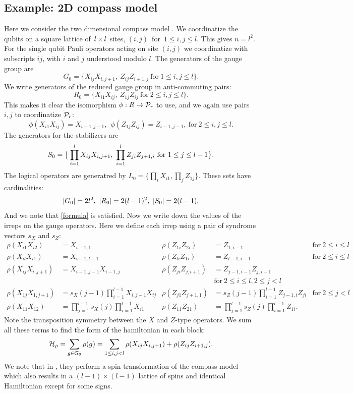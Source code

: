 \documentclass[12pt,notitlepage,longbibliography,nofootinbib,tightenlines]{revtex4}
\begin{document}
\subsection{Example: 2D compass model}

Here we consider the two dimensional compass model \cite{Bacon2006}.
We coordinatize the qubits on a square 
lattice of\ $l\times l$\ sites,
$(i, j)$\ for\ $1\le i, j\le l.$
This gives $n = l^2.$
For the single qubit Pauli operators acting on site
$(i, j)$ we coordinatize with subscripts $ij$, 
with $i$ and $j$ understood modulo $l$.
The generators of the gauge group are
$$
    G_0 = \big\{ X_{ij}X_{i,j+1},\ Z_{ij}Z_{i+1,j}\ \mbox{for}\ 1\le i, j\le l\big\}.
$$
We write generators of the reduced
gauge group in anti-commuting pairs:
$$
    R_0 = \big\{ X_{i1}X_{ij},\ Z_{1j}Z_{ij}\ \mbox{for}\ 2\le i, j\le l\big\}.
$$
This makes it clear the isomorphism $\phi : R \to \mathcal{P}_r$ to use,
and we again use pairs $i,j$ to coordinatize $\mathcal{P}_r$:
$$
    \phi(X_{i1}X_{ij}) = X_{i-1,j-1}, \ \ \phi(Z_{1j}Z_{ij}) = Z_{i-1,j-1},\ \mbox{for}\ 2\le i, j\le l.
$$
The generators for the stabilizers are
$$
    \Stab_0 = \big\{ \prod_{i=1}^l X_{ij}X_{i,j+1},\ \prod_{i=1}^l Z_{ji}Z_{j+1,i}\ \mbox{for}\ 1\le j\le l-1\big\}.
$$
The logical operators are generatred by $L_0 = \big\{ \prod_i X_{i1}, \prod_j Z_{1j} \}.$
These sets have cardinalities:
$$|G_0|=2l^2,\ |R_0| = 2(l-1)^2,\ |\Stab_0| = 2(l-1).$$
And we note that \ref{formula} is satisfied.
Now we write down the values of the
irreps on the gauge operators.
Here we define each irrep using a pair 
of syndrome vectors $s_X$ and $s_Z:$
\begin{align*}
\rho(X_{i1} X_{i2}) &= X_{i-1,1} &
\rho(Z_{1i} Z_{2i}) &= Z_{1,i-1} &\mbox{for}\ 2\le i\le l\\
\rho(X_{il} X_{i1}) &= X_{i-1,l-1} &
\rho(Z_{li} Z_{1i}) &= Z_{l-1,i-1} &\mbox{for}\ 2\le i\le l\\
\rho(X_{ij} X_{i,j+1}) &= X_{i-1,j-1} X_{i-1,j} &
\rho(Z_{ji} Z_{j,i+1}) &= Z_{j-1,i-1}Z_{j,i-1} \\&&&\mbox{for}\ 2\le i\le l, 2\le j<l\\
\rho(X_{1j} X_{1,j+1}) &= s_X(j-1) \prod_{i=1}^{l-1} X_{i,j-1} X_{ij} &
\rho(Z_{j1} Z_{j+1,1}) &= s_Z(j-1) \prod_{i=1}^{l-1} Z_{j-1,i} Z_{ji} &\mbox{for}\ 2\le j<l\\
\rho(X_{11} X_{12}) &= \prod_{j=1}^{l-1}s_X(j) \prod_{i=1}^{l-1} X_{i1} &
\rho(Z_{11} Z_{21}) &= \prod_{j=1}^{l-1}s_Z(j) \prod_{i=1}^{l-1} Z_{1i}.
\end{align*}
Note the transposition symmetry between the $X$ and $Z$-type operators.
We sum all these terms to find 
the form of the hamiltonian in each block:
$$
\mathcal{H}_\rho = \sum_{g\in G_0} \rho(g) = \sum_{1\le i,j<l} \rho(X_{ij}X_{i,j+1}) + \rho(Z_{ij}Z_{i+1,j}).
$$
We note that in \cite{Brzezicki2013}, they perform a
spin transformation of the compass model
which also results in a $(l-1)\times(l-1)$ lattice
of spins and identical Hamiltonian except for some signs.
\end{document}
